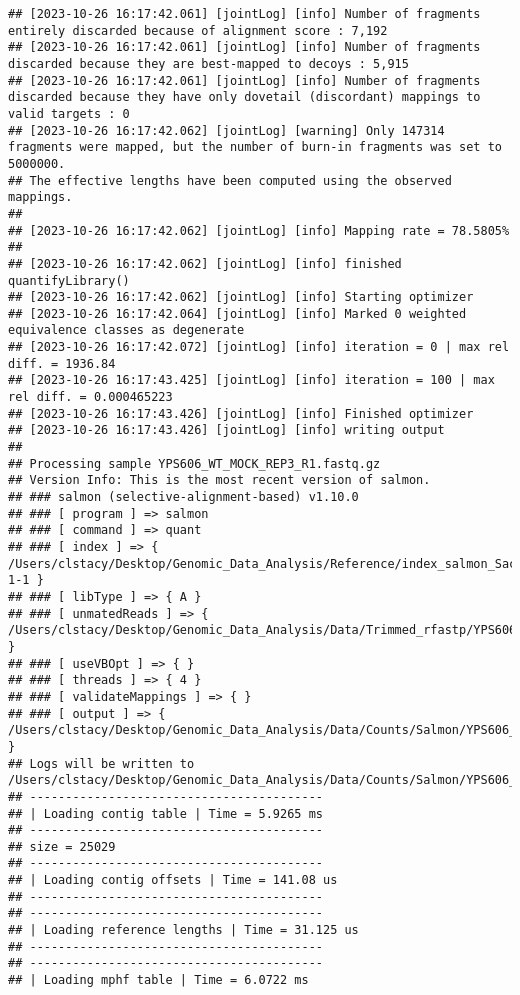 \documentclass[
]{book}
\begin{document}
\begin{verbatim}
## [2023-10-26 16:17:42.061] [jointLog] [info] Number of fragments entirely discarded because of alignment score : 7,192
## [2023-10-26 16:17:42.061] [jointLog] [info] Number of fragments discarded because they are best-mapped to decoys : 5,915
## [2023-10-26 16:17:42.061] [jointLog] [info] Number of fragments discarded because they have only dovetail (discordant) mappings to valid targets : 0
## [2023-10-26 16:17:42.062] [jointLog] [warning] Only 147314 fragments were mapped, but the number of burn-in fragments was set to 5000000.
## The effective lengths have been computed using the observed mappings.
## 
## [2023-10-26 16:17:42.062] [jointLog] [info] Mapping rate = 78.5805%
## 
## [2023-10-26 16:17:42.062] [jointLog] [info] finished quantifyLibrary()
## [2023-10-26 16:17:42.062] [jointLog] [info] Starting optimizer
## [2023-10-26 16:17:42.064] [jointLog] [info] Marked 0 weighted equivalence classes as degenerate
## [2023-10-26 16:17:42.072] [jointLog] [info] iteration = 0 | max rel diff. = 1936.84
## [2023-10-26 16:17:43.425] [jointLog] [info] iteration = 100 | max rel diff. = 0.000465223
## [2023-10-26 16:17:43.426] [jointLog] [info] Finished optimizer
## [2023-10-26 16:17:43.426] [jointLog] [info] writing output 
## 
## Processing sample YPS606_WT_MOCK_REP3_R1.fastq.gz
## Version Info: This is the most recent version of salmon.
## ### salmon (selective-alignment-based) v1.10.0
## ### [ program ] => salmon 
## ### [ command ] => quant 
## ### [ index ] => { /Users/clstacy/Desktop/Genomic_Data_Analysis/Reference/index_salmon_Saccharomyces_cerevisiae.R64-1-1 }
## ### [ libType ] => { A }
## ### [ unmatedReads ] => { /Users/clstacy/Desktop/Genomic_Data_Analysis/Data/Trimmed_rfastp/YPS606_WT_MOCK_REP3_R1.fastq.gz }
## ### [ useVBOpt ] => { }
## ### [ threads ] => { 4 }
## ### [ validateMappings ] => { }
## ### [ output ] => { /Users/clstacy/Desktop/Genomic_Data_Analysis/Data/Counts/Salmon/YPS606_WT_MOCK_REP3_R1.fastq.gz_quant }
## Logs will be written to /Users/clstacy/Desktop/Genomic_Data_Analysis/Data/Counts/Salmon/YPS606_WT_MOCK_REP3_R1.fastq.gz_quant/logs
## -----------------------------------------
## | Loading contig table | Time = 5.9265 ms
## -----------------------------------------
## size = 25029
## -----------------------------------------
## | Loading contig offsets | Time = 141.08 us
## -----------------------------------------
## -----------------------------------------
## | Loading reference lengths | Time = 31.125 us
## -----------------------------------------
## -----------------------------------------
## | Loading mphf table | Time = 6.0722 ms

\end{verbatim}
\end{document}
